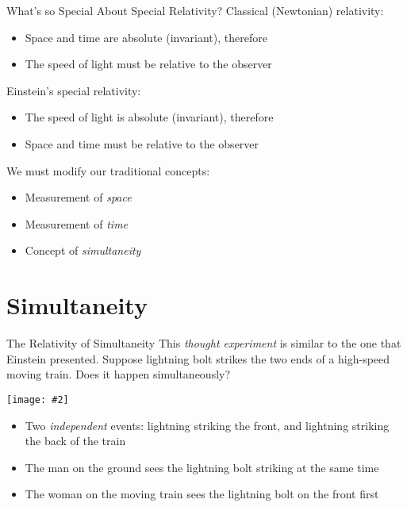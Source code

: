 \documentclass[12pt,compress,aspectratio=169]{beamer}
\newcommand{\pic}[2]{\texttt{[image: \#2]}}
\begin{document}
\begin{frame}{What's so Special About Special Relativity?}
  Classical (Newtonian) relativity:
  \begin{itemize}
  \item Space and time are absolute (invariant), therefore
  \item The speed of light must be relative to the observer
  \end{itemize}

  \vspace{.1in}Einstein's special relativity:
  \begin{itemize}
  \item The speed of light is absolute (invariant), therefore
  \item Space and time must be relative to the observer
  \end{itemize}

  \vspace{.1in}We must modify our traditional concepts:
  \begin{itemize}
  \item Measurement of \emph{space}
  \item Measurement of \emph{time}
  \item Concept of \emph{simultaneity}
  \end{itemize}
\end{frame}



\section{Simultaneity}

\begin{frame}{The Relativity of Simultaneity}
  This \emph{thought experiment} is similar to the one that Einstein presented.
  Suppose lightning bolt strikes the two ends of a high-speed moving train.
  Does it happen simultaneously?
  \begin{center}
    \pic{.4}{graphics/87-1-1024x673.png}
  \end{center}

  \begin{itemize}
  \item\vspace{-.15in} Two \emph{independent} events: lightning striking the
    front, and lightning striking the back of the train
  \item The man on the ground sees the lightning bolt striking at the same time
  \item The woman on the moving train sees the lightning bolt on the front first
  \end{itemize}
\end{frame}
\end{document}
